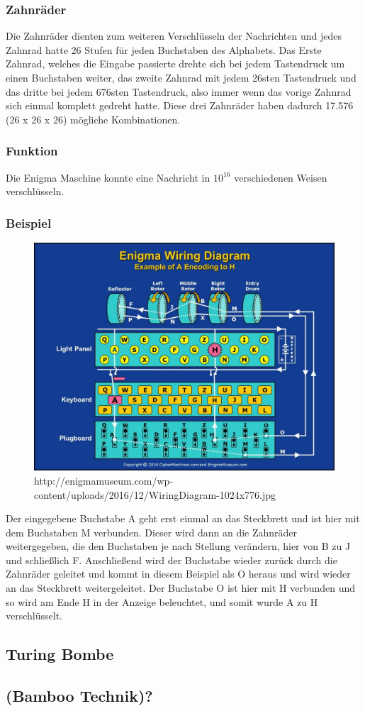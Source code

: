 \subsubsection{Zahnräder}
Die Zahnräder dienten zum weiteren Verschlüsseln der Nachrichten und jedes Zahnrad hatte 26 Stufen für jeden Buchstaben des Alphabets. Das Erste Zahnrad, welches die Eingabe passierte drehte sich bei jedem Tastendruck um einen Buchstaben weiter, das zweite Zahnrad mit jedem 26sten Tastendruck und das dritte bei jedem 676sten Tastendruck, also immer wenn das vorige Zahnrad sich einmal komplett gedreht hatte. Diese drei Zahnräder haben dadurch 17.576 (26 x 26 x 26) mögliche Kombinationen.

\subsubsection{Funktion}
Die Enigma Maschine konnte eine Nachricht in $10^{16}$ verschiedenen Weisen verschlüsseln.

\subsubsection{Beispiel}

\begin{figure}[hbtp]
\centering
\includegraphics[scale=0.2]{Enigma_Maschine_Beispiel.jpg}
\caption{http://enigmamuseum.com/wp-content/uploads/2016/12/WiringDiagram-1024x776.jpg}
\end{figure}

Der eingegebene Buchstabe A geht erst einmal an das Steckbrett und ist hier mit dem Buchstaben M verbunden. Dieser wird dann an die Zahnräder weitergegeben, die den Buchstaben je nach Stellung verändern, hier von B zu J und schließlich F. Anschließend wird der Buchstabe wieder zurück durch die Zahnräder geleitet und kommt in diesem Beispiel als O heraus und wird wieder an das Steckbrett weitergeleitet. Der Buchstabe O ist hier mit H verbunden und so wird am Ende H in der Anzeige beleuchtet, und somit wurde A zu H verschlüsselt.

\subsection{Turing Bombe}


\subsection{(Bamboo Technik)?}
